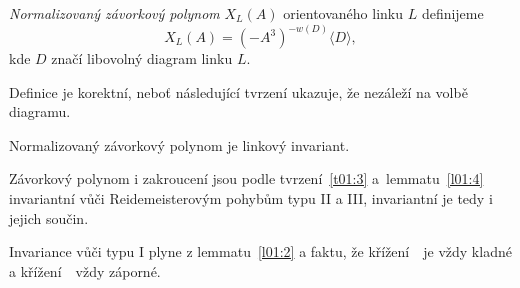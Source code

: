 \begin{definice}\label{def01:4}
\emph{Normalizovaný závorkový polynom} $X_L(A)$ orientovaného linku $L$ definijeme $$X_L(A) = (-A^3)^{-w(D)}\langle D \rangle,$$ kde $D$ značí libovolný diagram linku $L$.
\end{definice}

\begin{pozn}
Definice je korektní, neboť následující tvrzení ukazuje, že nezáleží na volbě diagramu.
\end{pozn}

\begin{tvrz}\label{t01:5}
Normalizovaný závorkový polynom je linkový invariant.
\end{tvrz}
\begin{dukaz}
Závorkový polynom i zakroucení jsou podle tvrzení~\ref{t01:3} a~lemmatu~\ref{l01:4} invariantní vůči Reidemeisterovým pohybům typu II a III, invariantní je tedy i jejich součin.

Invariance vůči typu I plyne z lemmatu~\ref{l01:2} a faktu, že křížení~\plussmycka~je vždy kladné a křížení~\minussmycka~vždy záporné.
\end{dukaz}

